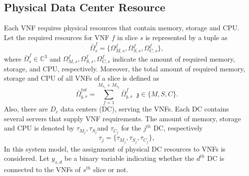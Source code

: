 \documentclass[conference]{IEEEtran}
\begin{document}
\subsection{Physical Data Center Resource}
Each VNF requires
physical resources that contain memory, storage and CPU.
Let the required resources for VNF $f$ in slice $s$ is represented by a tuple as
\begin{equation}
\bar{\Omega}_{s}^f = \{\Omega_{M,{s}}^f, \Omega_{S,{s}}^f, \Omega_{C,{s}}^f \},
\end{equation}
where $\bar{\Omega}_{s}^f\in \mathbb{C}^{3}$ and $\Omega_{M,{s}}^f, \Omega_{S,{s}}^f, \Omega_{C,{s}}^f$ indicate the amount of required memory, storage, and CPU, respectively.
Moreover, the total amount of required memory, storage and CPU of all VNFs of a slice is defined as
\begin{equation}
\textstyle \bar{\Omega}_{\mathfrak{z},s}^{tot} = \sum_{f=1}^{M_{s_1} + M_{s_2}}\bar{\Omega}_{\mathfrak{z},s}^f \;\; \mathfrak{z} \in \{M, S, C\}.
\end{equation}
Also, there are $D_c$ data centers (DC), serving the VNFs. Each DC contains several servers that supply VNF requirements.
The amount of memory, storage and CPU is denoted by $\tau_{M_{j}}, \tau_{S_{j}}$and $\tau_{C_{j}} $ for the $j^{th}$ DC, respectively
\begin{equation*}
\tau_j = \{\tau_{M_{j}}, \tau_{S_{j}}, \tau_{C_{j}} \},
\end{equation*}
In this system model, the assignment of physical DC resources to VNFs is considered. Let $y_{s,d}$ be a binary variable indicating whether the $d^{th}$ DC is connected to the VNFs of $s^{th}$ slice or not.
\end{document}
